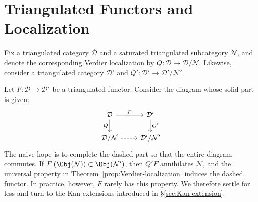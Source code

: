 
\section{Triangulated Functors and Localization}\label{sec:triangulated-functor-localization}
\hypertarget{o014.aljabr2.chapter4.triangulated-functor-localization}{ }

Fix a triangulated category $\mathcal{D}$ and a saturated triangulated
subcategory $\mathcal{N}$, and denote the corresponding Verdier localization
by $Q: \mathcal{D} \to \mathcal{D}/\mathcal{N}$. Likewise, consider a
triangulated category $\mathcal{D}'$ and
$Q': \mathcal{D}' \to \mathcal{D}'/\mathcal{N}'$.

Let $F: \mathcal{D} \to \mathcal{D}'$ be a triangulated functor. Consider the
diagram whose solid part is given:
\begin{equation}\label{eqn:derived-situation}\begin{tikzcd}
	\mathcal{D} \arrow[r, "F"] \arrow[d, "Q"'] & \mathcal{D}' \arrow[d, "{Q'}"] \\
	\mathcal{D}/\mathcal{N} \arrow[dashed, r] & \mathcal{D}'/\mathcal{N}'
\end{tikzcd}\end{equation}
The naive hope is to complete the dashed part so that the entire diagram
commutes. If
$F\left(\Obj(\mathcal{N})\right) \subset \Obj(\mathcal{N}')$, then $Q'F$
annihilates $\mathcal{N}$, and the universal property in
Theorem~\ref{prop:Verdier-localization} induces the dashed functor. In practice,
however, $F$ rarely has this property. We therefore settle for less and turn to
the Kan extensions introduced in \S\ref{sec:Kan-extension}.


